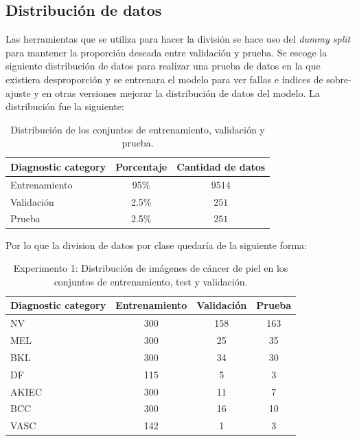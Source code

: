 \subsection*{Distribución de datos}

Las herramientas que se utiliza para hacer la división se hace uso del \textit{dummy split}  para mantener la proporción deseada entre validación y prueba. Se escoge la siguiente distribución de datos para realizar una prueba de datos en la que existiera desproporción y se entrenara el modelo para ver fallas e índices de sobre-ajuste y en otras versiones mejorar la distribución de datos del modelo. La distribución fue la siguiente:

\begin{table}[H]
   \small
   \centering
   \begin{tabular}{lcc}
   \hline
   \textbf{Diagnostic category} & \textbf{Porcentaje} & \textbf{Cantidad de datos} \\
   \hline
   Entrenamiento       & 95\% & $9514$ \\
   Validación      & 2.5\% & $251$  \\
   Prueba      & 2.5\% & $251$  \\ \hline
   \end{tabular}
   \caption{Distribución de los conjuntos de entrenamiento, validación y prueba.}
   \label{table:data_distribution_e1}
   \end{table}

   Por lo que la division de datos por clase quedaría de la siguiente forma:

   \begin{table}[H]
      \small
      \centering
      \begin{tabular}{lccc}
      \hline
      \textbf{Diagnostic category} & \textbf{Entrenamiento} & \textbf{Validación} & \textbf{Prueba} \\
      \hline
      NV       & 300 & 158 & 163 \\
      MEL      & 300 & 25  & 35  \\
      BKL      & 300 & 34  & 30  \\
      DF       & 115 & 5   & 3   \\
      AKIEC    & 300 & 11  & 7   \\
      BCC      & 300 & 16  & 10  \\
      VASC     & 142 & 1   & 3   \\ \hline
      \end{tabular}
      \caption{Experimento 1: Distribución de imágenes de cáncer de piel en los conjuntos de entrenamiento, test y validación.}
      \label{table:train_test_validate_e1}
      \end{table}
   

